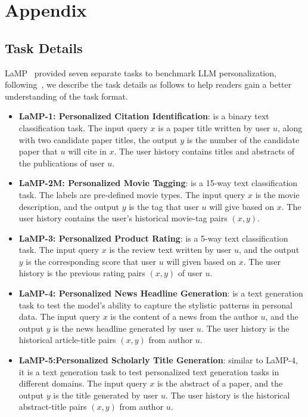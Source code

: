 \documentclass[11pt]{article}
\begin{document}
\appendix

\section{Appendix}
\label{sec:appendix}


\subsection{Task Details}
\label{sec:appendix-task}
LaMP~\cite{salemi-etal-2024-lamp} provided seven separate tasks to benchmark LLM personalization, following~\cite{tan-etal-2024-democratizing,tan-etal-2024-personalized}, we describe the task details as follows to help readers gain a better understanding of the task format.
\begin{itemize}
    \item \textbf{LaMP-1: Personalized Citation Identification}: is a binary text classification task. The input query $x$ is a paper title written by user $u$, along with two candidate paper titles, the output $y$ is the number of the candidate paper that $u$ will cite in $x$. The user history contains titles and abstracts of the publications of user $u$.
    
    \item \textbf{LaMP-2M: Personalized Movie Tagging}: is a 15-way text classification task. The labels are pre-defined movie types. The input query $x$ is the movie description, and the output $y$ is the tag that user $u$ will give based on $x$. The user history contains the user’s historical movie-tag pairs $(x,y)$.
    
    \item \textbf{LaMP-3: Personalized Product Rating}: is a 5-way text classification task. The input query $x$ is the review text written by user $u$, and the output $y$ is the corresponding score that user $u$ will given based on $x$. The user history is the previous rating pairs $(x,y)$ of user $u$.

    \item \textbf{LaMP-4: Personalized News Headline Generation}: is a text generation task to test the model’s ability to capture the stylistic patterns in personal data. The input query $x$ is the content of a news from the author $u$, and the output $y$ is the news headline generated by user $u$. The user history is the historical article-title pairs $(x,y)$ from author $u$.
  
    \item \textbf{LaMP-5:Personalized Scholarly Title Generation}: similar to LaMP-4, it is a text generation task to test personalized text generation tasks in different domains. The input query $x$ is the abstract of a paper, and the output $y$ is the title generated by user $u$. The user history is the historical abstract-title pairs $(x,y)$ from author $u$.
    

\end{itemize}
\end{document}
